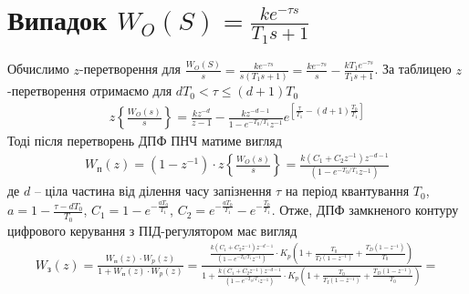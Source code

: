 \section{Випадок \texorpdfstring{$W_O(S) = \frac{k e^{-\tau s}}{T_1 s + 1}$}{3}}
Обчислимо $z$-перетворення для $\frac{W_O(S)}{s} = \frac{k e^{-\tau s}}{s(T_1 s + 1)} = 
\frac{k e^{-\tau s}}{s} - \frac{k T_1 e^{-\tau s}}{T_1 s + 1}$.
За таблицею $z$-перетворення отримаємо для $d T_0 < \tau \leq (d+1)T_0$
\begin{gather}
    z\left\{\frac{W_O(s)}{s} \right\} = \frac{k z^{-d}}{z - 1} - 
    \frac{k z^{-d-1}}{1 - e^{-T_0/ T_1} z^{-1}} 
    e^{\left[
        \frac{\tau}{T_1} - (d+1) \frac{T_0}{T_1}
     \right]}
\end{gather}
Тоді після перетворень ДПФ ПНЧ матиме вигляд
\begin{gather}
    W_{\text{п}}(z) = \left(1 - z^{-1}\right) \cdot z\left\{\frac{W_O(s)}{s} \right\} = 
    \frac{
        k \left(C_1 + C_2 z^{-1}\right) z^{-d-1}
    }{
        \left(1 - e^{-T_0 / T_1} z^{-1}\right)
    }
\end{gather}
де $d$ -- ціла частина від ділення часу запізнення $\tau$ на період квантування
$T_0$, $a = 1 - \frac{\tau - d T_0}{T_0}$, $C_1 = 1 - e^{-\frac{a T_0}{T_1}}$,
$C_2 = e^{-\frac{a T_0}{T_1}} - e^{-\frac{T_0}{T_1}}$.
Отже, ДПФ замкненого контуру цифрового керування з ПІД-регулятором має вигляд
\begin{gather*}
    W_{\text{з}}(z) = \frac{
        W_{\text{п}} (z) \cdot W_p(z)
    }{1 + W_{\text{п}} (z) \cdot W_p(z)} =
    \frac{
        \frac{
            k \left(C_1 + C_2 z^{-1}\right) z^{-d-1}
        }{
            \left(1 - e^{-T_0 / T_1} z^{-1}\right)
        } \cdot K_p \left(
            1 + \frac{T_0}{T_I \left(1 - z^{-1}\right)} + \frac{T_D\left(1 - z^{-1}\right)}{T_0}
        \right)
    }{
        1 + \frac{
            k \left(C_1 + C_2 z^{-1}\right) z^{-d-1}
        }{
            \left(1 - e^{-T_0 / T_1} z^{-1}\right)
        } \cdot K_p \left(
            1 + \frac{T_0}{T_I \left(1 - z^{-1}\right)} + \frac{T_D\left(1 - z^{-1}\right)}{T_0}
        \right)
    } =
\end{gather*}

